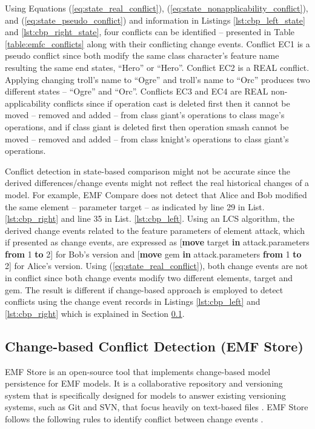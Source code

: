 Using Equations (\ref{eq:state_real_conflict}), (\ref{eq:state_nonapplicability_conflict}), and (\ref{eq:state_pseudo_conflict}) and information in Listings \ref{lst:cbp_left_state} and \ref{lst:cbp_right_state}, four conflicts can be identified -- presented in Table \ref{table:emfc_conflicts} along with their conflicting change events. Conflict \textsf{EC1} is a \textsf{pseudo} conflict since both modify the same class \textsf{character}'s feature \textsf{name} resulting the same end states, ``Hero'' or ``Hero''. Conflict \textsf{EC2} is a \textsf{REAL} conflict. Applying changing \textsf{troll}'s \textsf{name} to ``Ogre'' and \textsf{troll}'s \textsf{name} to ``Orc'' produces two different states -- ``Ogre'' and ``Orc''. Conflicts \textsf{EC3} and \textsf{EC4} are \textsf{REAL} non-applicability conflicts since if operation \textsf{cast} is deleted first then it cannot be moved -- removed and added -- from class \textsf{giant}'s \textsf{operations} to class \textsf{mage}'s \textsf{operations}, and if class \textsf{giant} is deleted first then operation \textsf{smash} cannot be moved -- removed and added -- from  class \textsf{knight}'s \textsf{operations} to class \textsf{giant}'s \textsf{operations}.

Conflict detection in state-based comparison might not be accurate since the derived differences/change events might not reflect the real historical changes of a model. For example, EMF Compare \cite{emfcompare2018developer} does not detect that Alice and Bob modified the same element -- parameter \textsf{target} -- as indicated by line 29 in List. \ref{lst:cbp_right} and line 35 in List. \ref{lst:cbp_left}. Using an LCS algorithm, the derived change events related to the feature \textsf{parameters} of element \textsf{attack}, which if presented as change events, are expressed as [\textsf{\small \textbf{move} target \textbf{in} attack.parameters \textbf{from} 1 \textbf{to} 2}] for Bob's version and [\textsf{\small \textbf{move} gem \textbf{in} attack.parameters \textbf{from} 1 \textbf{to} 2}] for Alice's version. Using (\ref{eq:state_real_conflict}), both change events are not in conflict since both change events modify two different elements, \textsf{target} and \textsf{gem}. The result is different if change-based approach is employed to detect conflicts using the change event records in Listings \ref{lst:cbp_left} and \ref{lst:cbp_right} which is explained in Section \ref{sec:emfstore_conflict_detection}.

\subsection{Change-based Conflict Detection (EMF Store)}
\label{sec:emfstore_conflict_detection}
EMF Store \cite{koegel2010emfstore} is an open-source tool that implements change-based model persistence for EMF models. It is a collaborative repository and versioning system that is specifically designed for models to answer existing versioning systems, such as Git and SVN, that focus heavily on text-based files \cite{emfstore2019what}. EMF Store follows the following rules to identify conflict between change events \cite{koegel2010operation}. 

